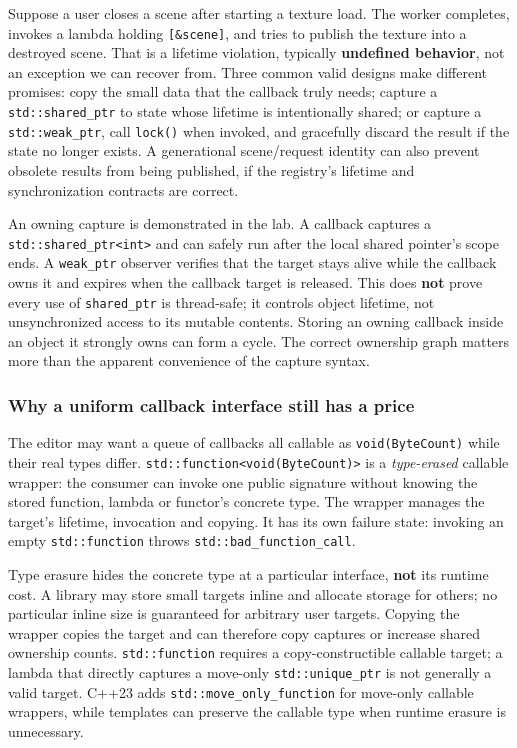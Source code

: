 Suppose a user closes a scene after starting a texture load. The worker completes, invokes a lambda holding \texttt{{[}\&scene{]}}, and tries to publish the texture into a destroyed scene. That is a lifetime violation, typically \textbf{undefined behavior}, not an exception we can recover from. Three common valid designs make different promises: copy the small data that the callback truly needs; capture a \texttt{std::shared\_ptr} to state whose lifetime is intentionally shared; or capture a \texttt{std::weak\_ptr}, call \texttt{lock()} when invoked, and gracefully discard the result if the state no longer exists. A generational scene/request identity can also prevent obsolete results from being published, if the registry's lifetime and synchronization contracts are correct.

An owning capture is demonstrated in the lab. A callback captures a \texttt{std::shared\_ptr\textless{}int\textgreater{}} and can safely run after the local shared pointer's scope ends. A \texttt{weak\_ptr} observer verifies that the target stays alive while the callback owns it and expires when the callback target is released. This does \textbf{not} prove every use of \texttt{shared\_ptr} is thread-safe; it controls object lifetime, not unsynchronized access to its mutable contents. Storing an owning callback inside an object it strongly owns can form a cycle. The correct ownership graph matters more than the apparent convenience of the capture syntax.

\subsubsection{Why a uniform callback interface still has a price}\label{why-a-uniform-callback-interface-still-has-a-price}

The editor may want a queue of callbacks all callable as \texttt{void(ByteCount)} while their real types differ. \texttt{std::function\textless{}void(ByteCount)\textgreater{}} is a \emph{type-erased} callable wrapper: the consumer can invoke one public signature without knowing the stored function, lambda or functor's concrete type. The wrapper manages the target's lifetime, invocation and copying. It has its own failure state: invoking an empty \texttt{std::function} throws \texttt{std::bad\_function\_call}.

Type erasure hides the concrete type at a particular interface, \textbf{not} its runtime cost. A library may store small targets inline and allocate storage for others; no particular inline size is guaranteed for arbitrary user targets. Copying the wrapper copies the target and can therefore copy captures or increase shared ownership counts. \texttt{std::function} requires a copy-constructible callable target; a lambda that directly captures a move-only \texttt{std::unique\_ptr} is not generally a valid target. C++23 adds \texttt{std::move\_only\_function} for move-only callable wrappers, while templates can preserve the callable type when runtime erasure is unnecessary.

